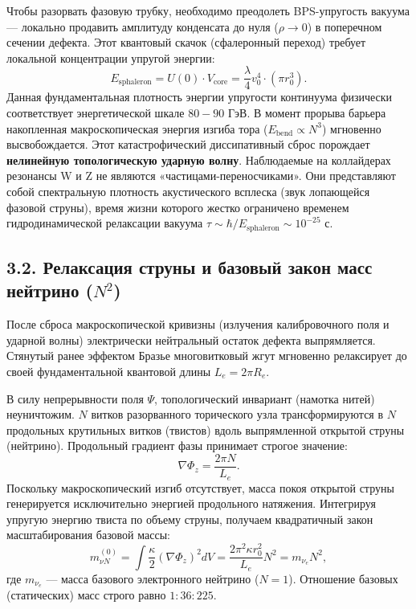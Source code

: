 \documentclass[12pt,a4paper]{article}
\begin{document}
	Чтобы разорвать фазовую трубку, необходимо преодолеть BPS-упругость вакуума — локально продавить амплитуду конденсата до нуля ($\rho \to 0$) в поперечном сечении дефекта. Этот квантовый скачок (сфалеронный переход) требует локальной концентрации упругой энергии:
	\begin{equation}
		E_{\text{sphaleron}} = U(0) \cdot V_{\text{core}} = \frac{\lambda}{4} v_0^4 \cdot (\pi r_0^3).
	\end{equation}
	Данная фундаментальная плотность энергии упругости континуума физически соответствует энергетической шкале $80-90$ ГэВ. В момент прорыва барьера накопленная макроскопическая энергия изгиба тора ($E_{\text{bend}} \propto N^3$) мгновенно высвобождается. 
	Этот катастрофический диссипативный сброс порождает \textbf{нелинейную топологическую ударную волну}. Наблюдаемые на коллайдерах резонансы W и Z не являются «частицами-переносчиками». Они представляют собой спектральную плотность акустического всплеска (звук лопающейся фазовой струны), время жизни которого жестко ограничено временем гидродинамической релаксации вакуума $\tau \sim \hbar / E_{\text{sphaleron}} \sim 10^{-25}$ с. 
	
	\subsection{3.2. Релаксация струны и базовый закон масс нейтрино ($N^2$)}
	После сброса макроскопической кривизны (излучения калибровочного поля и ударной волны) электрически нейтральный остаток дефекта выпрямляется. Стянутый ранее эффектом Бразье многовитковый жгут мгновенно релаксирует до своей фундаментальной квантовой длины $L_e = 2\pi R_e$.
	
	В силу непрерывности поля $\Psi$, топологический инвариант (намотка нитей) неуничтожим. $N$ витков разорванного торического узла трансформируются в $N$ продольных крутильных витков (твистов) вдоль выпрямленной открытой струны (нейтрино). Продольный градиент фазы принимает строгое значение:
	\begin{equation}
		\nabla \Phi_z = \frac{2\pi N}{L_e}.
	\end{equation}
	Поскольку макроскопический изгиб отсутствует, масса покоя открытой струны генерируется исключительно энергией продольного натяжения. Интегрируя упругую энергию твиста по объему струны, получаем квадратичный закон масштабирования базовой массы:
	\begin{equation}
		m_{\nu N}^{(0)} = \int \frac{\kappa}{2} (\nabla \Phi_z)^2 dV = \frac{2\pi^2 \kappa r_0^2}{L_e} N^2 = m_{\nu_e} N^2,
		\label{eq:neutrino_n2}
	\end{equation}
	где $m_{\nu_e}$ — масса базового электронного нейтрино ($N=1$). Отношение базовых (статических) масс строго равно $1 : 36 : 225$.
	
\end{document}
